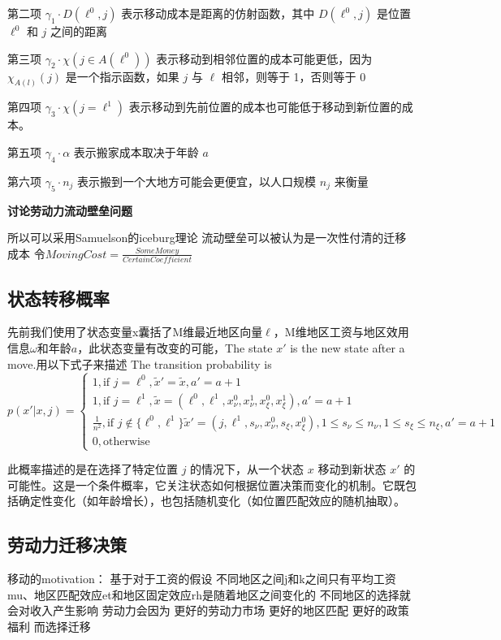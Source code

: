 \documentclass[a4paper,10pt]{article}
\begin{document}
第二项 $\gamma_1 \cdot D(\ell^0,j)$ 表示移动成本是距离的仿射函数，其中 $D(\ell^0, j)$ 是位置 $\ell^0$ 和 $j$ 之间的距离

第三项 $\gamma_2 \cdot\chi(j\in A(\ell^0))$ 表示移动到相邻位置的成本可能更低，因为 $\chi_{A(l)}(j)$ 是一个指示函数，如果 $j$ 与 $\ell$ 相邻，则等于 1，否则等于 0

第四项 $\gamma_3 \cdot\chi(j=\ell^1)$ 表示移动到先前位置的成本也可能低于移动到新位置的成本。

第五项 $\gamma_4 \cdot\alpha$ 表示搬家成本取决于年龄 $a$

第六项 $\gamma_5 \cdot n_j$ 表示搬到一个大地方可能会更便宜，以人口规模 $n_j$ 来衡量

\textbf{讨论劳动力流动壁垒问题}

所以可以采用Samuelson的iceburg理论 流动壁垒可以被认为是一次性付清的迁移成本
令$MovingCost = \frac{SomeMoney}{CertainCoefficient}$

\subsection{状态转移概率}
先前我们使用了状态变量x囊括了M维最近地区向量$\ell$，M维地区工资与地区效用信息$\omega$和年龄$a$，此状态变量有改变的可能，The state $x'$ is the new state after a move.用以下式子来描述
The transition probability is 
\begin{equation}
  p(x'|x,j)=
  \begin{cases}
    1, \text{if }j=\ell^0,\tilde x'=\tilde x,a'=a+1
    \\
    1, \text{if }j=\ell^1,\tilde x =(\ell^0,\ell^1,x_\nu^0,x_\nu^1,x_\xi^0,x_\xi^1),a'=a+1
    \\
    \frac{1}{n^2}, \text{if }j \notin \{\ell^0,\ell^1\}\tilde x'=(j,\ell^1,s_\nu,x_\nu^0,s_\xi,x_\xi^0),1\leqslant s_\nu \leqslant n_\nu,1\leqslant s_\xi \leqslant n_\xi,a'=a+1
    \\
    0, \text{otherwise}
  \end{cases}
\end{equation}

此概率描述的是在选择了特定位置 $j$ 的情况下，从一个状态 $x$ 移动到新状态 $x'$ 的可能性。这是一个条件概率，它关注状态如何根据位置决策而变化的机制。它既包括确定性变化（如年龄增长），也包括随机变化（如位置匹配效应的随机抽取）。

\subsection{劳动力迁移决策}
移动的motivation：
基于对于工资的假设
不同地区之间j和k之间只有平均工资mu、地区匹配效应et和地区固定效应rh是随着地区之间变化的
不同地区的选择就会对收入产生影响
劳动力会因为
更好的劳动力市场
更好的地区匹配
更好的政策福利
而选择迁移
\end{document}
